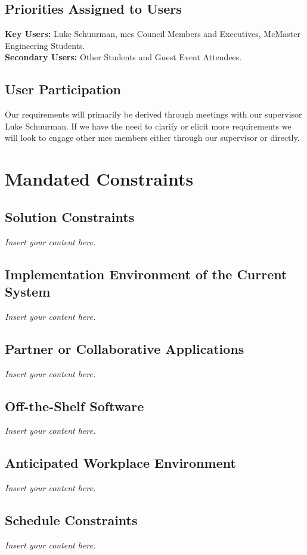\documentclass[12pt]{article}
\newcommand{\lips}{\textit{Insert your content here.}}
\begin{document}
\subsection{Priorities Assigned to Users}
\textbf{Key Users:} Luke Schuurman, \gls{mes} Council Members and Executives, McMaster Engineering Students. \\
\textbf{Secondary Users:} Other Students and Guest Event Attendees.
\subsection{User Participation}
Our requirements will primarily be derived through meetings with our supervisor Luke Schuurman. If we have the need to
clarify or elicit more requirements we will look to engage other \gls{mes} members either through our supervisor or
directly.


\section{Mandated Constraints}
\subsection{Solution Constraints}
\lips
\subsection{Implementation Environment of the Current System}
\lips
\subsection{Partner or Collaborative Applications}
\lips
\subsection{Off-the-Shelf Software}
\lips
\subsection{Anticipated Workplace Environment}
\lips
\subsection{Schedule Constraints}
\lips
\end{document}
